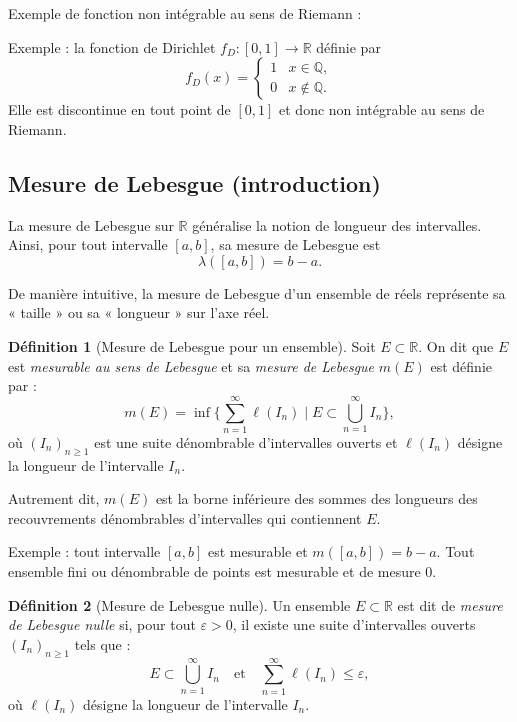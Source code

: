 \documentclass{report} %
\theoremstyle{definition}  %
\newtheorem{definition}{Définition}[chapter] %
\theoremstyle{plain} %
\theoremstyle{remark} %
\begin{document}
\medskip
\noindent
Exemple de fonction non intégrable au sens de Riemann :  

\medskip
Exemple : la fonction de Dirichlet \(f_D : [0,1] \to \mathbb{R}\) définie par
\[
f_D(x) =
\begin{cases}
1 & x \in \mathbb{Q},\\
0 & x \notin \mathbb{Q}.
\end{cases}
\]
Elle est discontinue en tout point de \([0,1]\) et donc non intégrable au sens de Riemann.




\subsection{Mesure de Lebesgue (introduction)}

La mesure de Lebesgue sur \(\mathbb{R}\) généralise la notion de longueur
des intervalles.
Ainsi, pour tout intervalle \([a,b]\), sa mesure de Lebesgue est
\[
\lambda([a,b]) = b-a.
\]

De manière intuitive, la mesure de Lebesgue d’un ensemble de réels
représente sa « taille » ou sa « longueur » sur l’axe réel.


\medskip
\begin{definition}[Mesure de Lebesgue pour un ensemble]
Soit $E \subset \mathbb{R}$. On dit que $E$ est \emph{mesurable au sens de Lebesgue} et sa \emph{mesure de Lebesgue} $m(E)$ est définie par :
\[
m(E) = \inf \Bigg\{ \sum_{n=1}^{\infty} \ell(I_n) \;\Big|\; E \subset \bigcup_{n=1}^{\infty} I_n \Bigg\},
\]
où $(I_n)_{n \ge 1}$ est une suite dénombrable d'intervalles ouverts et $\ell(I_n)$ désigne la longueur de l'intervalle $I_n$.

Autrement dit, $m(E)$ est la borne inférieure des sommes des longueurs des recouvrements dénombrables d'intervalles qui contiennent $E$.
\end{definition}


\medskip
Exemple : tout intervalle $[a,b]$ est mesurable et $m([a,b]) = b-a$.  
Tout ensemble fini ou dénombrable de points est mesurable et de mesure $0$.


\medskip
\begin{definition}[Mesure de Lebesgue nulle]
Un ensemble \(E \subset \mathbb{R}\) est dit de \emph{mesure de Lebesgue nulle} si, pour tout \(\varepsilon > 0\), il existe une suite d'intervalles ouverts 
\((I_n)_{n \ge 1}\) tels que :
\[
E \subset \bigcup_{n=1}^{\infty} I_n
\quad \text{et} \quad
\sum_{n=1}^{\infty} \ell(I_n) \le \varepsilon,
\]
où \(\ell(I_n)\) désigne la longueur de l'intervalle \(I_n\).
\end{definition}
\end{document}
